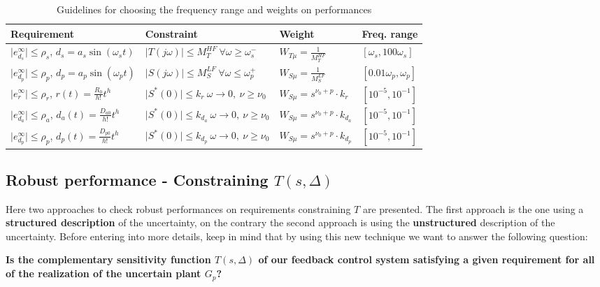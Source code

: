\documentclass[a4paper, 12pt]{article}
\begin{document}
\begin{table}[h]
    \centering
    \begin{tabular}{p{5cm} p{5cm} p{3cm} p{3cm}}
        \midrule[1.5pt]
        \textbf{Requirement}&\textbf{Constraint}&\textbf{Weight}&\textbf{Freq. range}\\
        \midrule
        $\vert e_{d_s}^\infty \vert \le \rho_s$, $d_s=a_s\sin(\omega_s{t})$&$\vert T(j\omega) \vert \le M_T^{HF} \ \forall \omega \ge \omega_s^{-}$&$W_{T\mu}=\frac{1}{M_T^{HF}}$&$[\omega_s,100\omega_s]$\\
        \midrule
        $\vert e_{d_p}^\infty \vert \le \rho_p$, $d_p=a_p\sin(\omega_p{t})$&$\vert S(j\omega) \vert \le M_S^{LF} \ \forall \omega \le \omega_p^{+}$&$W_{S\mu}=\frac{1}{M_S^{LF}}$&$[0.01\omega_p,\omega_p]$\\
        \midrule
        $\vert e_r^\infty \vert \le \rho_r$, $r(t)=\frac{R_0}{h!}{t^h}$& $\vert S^{*}(0) \vert \le k_{r} \ \omega \to 0, \ \nu\ge\nu_0$&$W_{S\mu}=s^{\nu_0+p} \cdot k_{r}$&$[10^{-5},10^{-1}]$\\
        \midrule
        $\vert e_{d_a}^\infty \vert \le \rho_a$, $d_a(t)=\frac{D_{a0}}{h!}{t^h}$& $\vert S^{*}(0) \vert \le k_{d_a} \ \omega \to 0, \ \nu\ge\nu_0$&$W_{S\mu}=s^{\nu_0+p} \cdot k_{d_a}$&$[10^{-5},10^{-1}]$\\
        \midrule
        $\vert e_{d_p}^\infty \vert \le \rho_p$, $d_p(t)=\frac{D_{p0}}{h!}{t^h}$& $\vert S^{*}(0) \vert \le k_{d_p} \ \omega \to 0, \ \nu\ge\nu_0$&$W_{S\mu}=s^{\nu_0+p} \cdot k_{d_p}$&$[10^{-5},10^{-1}]$
    \end{tabular}
    \caption{Guidelines for choosing the frequency range and weights on performances}
    \label{tab:guideline}
\end{table}

\newpage
\subsection{Robust performance - Constraining $T(s,\Delta)$}
Here two approaches to check robust performances on requirements constraining $T$ are presented. The first approach is the one using a \textbf{structured description} of the uncertainty, on the contrary the second approach is using the \textbf{unstructured} description of the uncertainty. Before entering into more details, keep in mind that by using this new technique we want to answer the following question:
\begin{center}
    \textbf{Is the complementary sensitivity function $T(s,\Delta)$ of our feedback control system satisfying a given requirement for 
    all of the realization of the uncertain plant $G_p$?}
\end{center}
\end{document}
